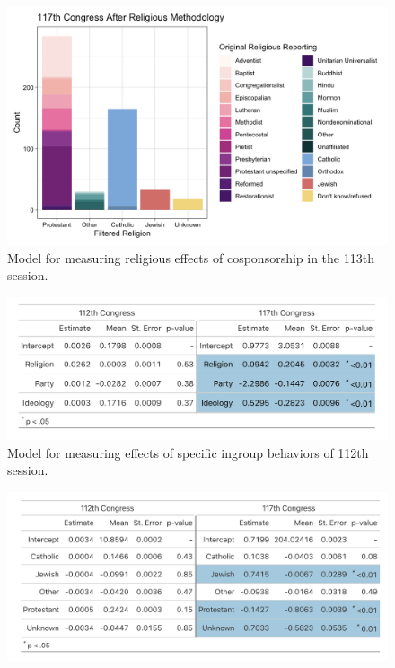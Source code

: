 \documentclass[Royal,times,sageh]{sagej}
\begin{document}
\begin{figure}

{\centering \includegraphics[width=0.7\linewidth]{images/117th religious} 

}

\caption{Model for measuring religious effects of cosponsorship in the 113th session. \label{table2}}\label{fig:table2}
\end{figure}

\begin{figure}

{\centering \includegraphics[width=0.7\linewidth]{images/final_model1} 

}

\caption{Model for measuring effects of specific ingroup behaviors of 112th session. \label{table3}}\label{fig:table3}
\end{figure}

\begin{figure}

{\centering \includegraphics[width=0.7\linewidth]{images/final_model2} 

}

\caption{\label{table4}}\label{fig:table4}
\end{figure}
\end{document}
